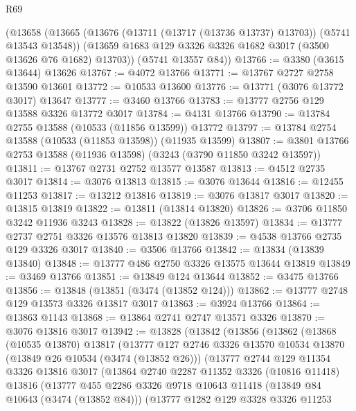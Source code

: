 \begin{lexlean}{R69}
\begin{coremodule}
    (@13658
      (@13665
        (@13676 (@13711 (@13717 (@13736 @13737) @13703)) (@5741 @13543 @13548))
        (@13659 @1683 @129 @3326 @3326 @1682 @3017 (@3500 @13626 @76 @1682) @13703))
      (@5741 @13557 @84))
@13766 := @3380 (@3615 @13644) @13626
@13767 := @4072 @13766
@13771 := @13767 @2727 @2758 @13590 @13601
@13772 := @10533 @13600
@13776 := @13771 (@3076 @13772 @3017) @13647
@13777 := @3460 @13766
@13783 := @13777 @2756 @129 @13588 @3326 @13772 @3017
@13784 := @4131 @13766
@13790 := @13784 @2755 @13588 (@10533 (@11856 @13599)) @13772
@13797 := @13784 @2754 @13588 (@10533 (@11853 @13598)) (@11935 @13599)
@13807 := @3801 @13766 @2753 @13588 (@11936 @13598) (@3243 (@3790 @11850 @3242 @13597))
@13811 := @13767 @2731 @2752 @13577 @13587
@13813 := @4512 @2735 @3017
@13814 := @3076 @13813
@13815 := @3076 @13644
@13816 := @12455 @11253
@13817 := @13212 @13816
@13819 := @3076 @13817 @3017
@13820 := @13815 @13819
@13822 := @13811 (@13814 @13820)
@13826 := @3706 @11850 @3242 @11936 @3243
@13828 := @13822 (@13826 @13597)
@13834 := @13777 @2737 @2751 @3326 @13576 @13813 @13820
@13839 := @4538 @13766 @2735 @129 @3326 @3017
@13840 := @3506 @13766
@13842 := @13834 (@13839 @13840)
@13848 := @13777 @486 @2750 @3326 @13575 @13644 @13819
@13849 := @3469 @13766
@13851 := @13849 @124 @13644
@13852 := @3475 @13766
@13856 := @13848 (@13851 (@3474 (@13852 @124)))
@13862 := @13777 @2748 @129 @13573 @3326 @13817 @3017
@13863 := @3924 @13766
@13864 := @13863 @1143
@13868 := @13864 @2741 @2747 @13571 @3326
@13870 := @3076 @13816 @3017
@13942 := @13828
    (@13842
      (@13856
        (@13862
          (@13868
            (@10535 @13870)
            @13817
            (@13777
              @127
              @2746
              @3326
              @13570
              @10534
              @13870
              (@13849 @26 @10534 (@3474 (@13852 @26)))
              (@13777
                @2744
                @129
                @11354
                @3326
                @13816
                @3017
                (@13864
                  @2740
                  @2287
                  @11352
                  @3326
                  (@10816 @11418)
                  @13816
                  (@13777
                    @455
                    @2286
                    @3326
                    @9718
                    @10643
                    @11418
                    (@13849 @84 @10643 (@3474 (@13852 @84)))
                    (@13777
                      @1282
                      @129
                      @3328
                      @3326
                      @11253

\end{coremodule}
\end{lexlean}
